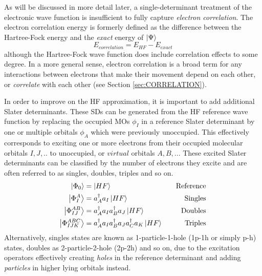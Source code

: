 As will be discussed in more detail later, a single-determinant treatment of the electronic wave function is insufficient to fully capture \emph{electron correlation}. The electron correlation energy is formerly defined as the difference between the Hartree-Fock energy and the \emph{exact} energy of $\ket{\Psi}$
\begin{equation}
E_{correlation} = E_{HF} - E_{exact}
\end{equation}
\noindent although the Hartree-Fock wave function does include correlation effects to some degree. In a more general sense, electron correlation is a broad term for any interactions between electrons that make their movement depend on each other, or \emph{correlate} with each other (see Section \ref{sec:CORRELATION}). 

In order to improve on the HF approximation, it is important to add additional Slater determinants. These SDs can be generated from the HF reference wave function by replacing the occupied MOs $\phi_I$ in a reference Slater determinant by one or multiple orbitals $\phi_A$ which were previously unoccupied. This effectively corresponds to exciting one or more electrons from their occupied molecular orbitals $I,J,..$ to unoccupied, or $virtual$ orbitals $A,B,..$. These excited Slater determinants can be classified by the number of electrons they excite and are often referred to as singles, doubles, triples and so on.
\begin{alignat}{2}
\ket{\Phi_0} &= \ket{HF} \quad & \text{Reference} \\
\ket{\Phi_{I}^{A}} &= a^{\dagger}_A a_I \ket{HF} \quad & \text{Singles}  \\
\ket{\Phi_{IJ}^{AB}} &= a^{\dagger}_A a_I a^{\dagger}_B a_J \ket{HF} \quad & \text{Doubles} \\
\ket{\Phi_{IJK}^{ABC}} &= a^{\dagger}_A a_I a^{\dagger}_B a_J a^{\dagger}_C a_K \ket{HF} \quad & \text{Triples} \\
\end{alignat}
\noindent Alternatively, singles states are known as 1-particle-1-hole (1p-1h or simply p-h) states, doubles as 2-particle-2-hole (2p-2h) and so on, due to the excitation operators effectively creating \emph{holes} in the reference determinant and adding \emph{particles} in higher lying orbitals instead. 

